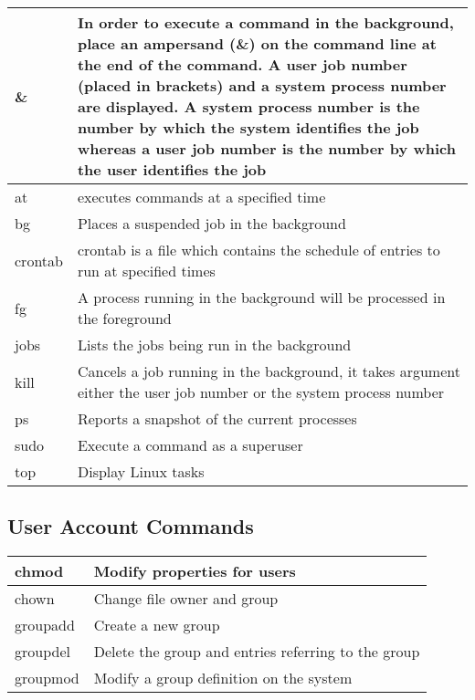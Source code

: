 \begin{tabular}{|p{}|p{}|} \hline
\&      & In order to execute a command in the background, place an ampersand (\&) on the command line at the end of the command. A user job number (placed in brackets) and a system process number are displayed. A system process number is the number by which the system identifies the job whereas a user job number is the number by which the user identifies the job \\ \hline
at      & executes commands at a specified time \\ \hline
bg      & Places a suspended job in the background \\ \hline
crontab & crontab is a file which contains the schedule of entries to run at specified times \\ \hline
fg      & A process running in the background will be processed in the foreground \\ \hline
jobs    & Lists the jobs being run in the background \\ \hline
kill    & Cancels a job running in the background, it takes argument either the user job number or the system process number \\ \hline
ps      & Reports a snapshot of the current processes \\ \hline
sudo    & Execute a command as a superuser \\ \hline
top     & Display Linux tasks \\ \hline
\end{tabular}


\subsection{User Account Commands}

\begin{tabular}{|p{}|p{}|} \hline
chmod    & Modify properties for users \\ \hline
chown    & Change file owner and group \\ \hline
groupadd & Create a new group \\ \hline
groupdel & Delete the group and entries referring to the group \\ \hline
groupmod & Modify a group definition on the system \\ \hline
\end{tabular}

